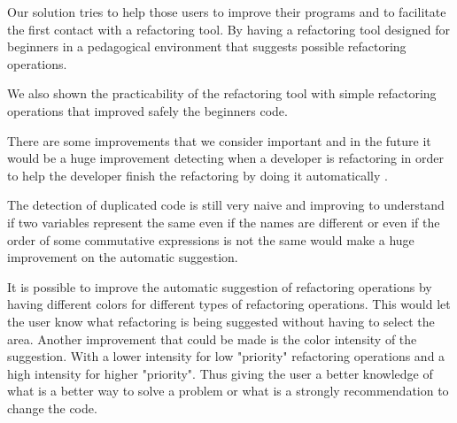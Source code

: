 Our solution tries to help those users to improve their programs and to facilitate
the first contact with a refactoring tool.
By having a refactoring tool designed for beginners in a pedagogical environment
that suggests possible refactoring operations.

We also shown the practicability of the refactoring tool with simple refactoring operations
that improved safely the beginners code.


There are some improvements that we consider important and in the future it would  %
be a huge improvement detecting when a developer is refactoring in order to help the developer finish the
refactoring by doing it automatically \cite{ge2012reconciling}.

The detection of duplicated code is still very naive and improving to understand if
two variables represent the same even if the names are different or even if the
 order of some commutative expressions is not the same would make a huge improvement
 on the automatic suggestion.



It is possible to improve the automatic suggestion of refactoring operations by
having different colors for different types of refactoring operations.
This would let the user know what refactoring is being suggested without having to
select the area.
Another improvement that could be made is the color intensity of the suggestion.
With a lower intensity for low "priority" refactoring operations and a high intensity
for higher "priority". Thus giving the user a better knowledge of what is a better
way to solve a problem or what is a strongly recommendation to change the code.
